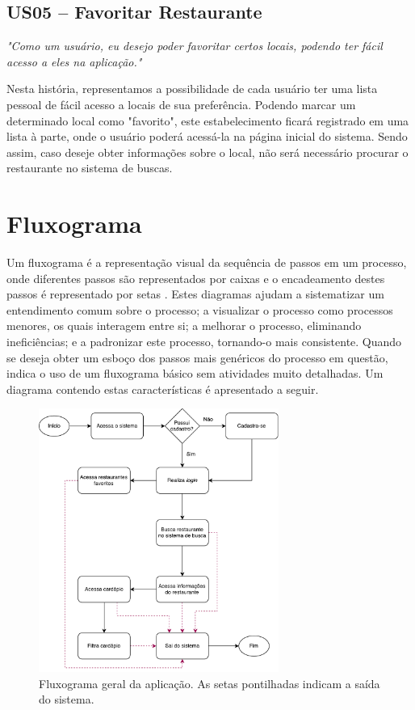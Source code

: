 \subsection{US05 -- Favoritar Restaurante}

\textit{"Como um usuário, eu desejo poder favoritar certos locais, podendo ter fácil acesso a eles na aplicação."}

Nesta história, representamos a possibilidade de cada usuário ter uma lista pessoal de fácil acesso a locais de sua preferência. Podendo marcar um determinado local como "favorito", este estabelecimento ficará registrado em uma lista à parte, onde o usuário poderá acessá-la na página inicial do sistema. Sendo assim, caso deseje obter informações sobre o local, não será necessário procurar o restaurante no sistema de buscas.

\section{Fluxograma}
Um fluxograma é a representação visual da sequência de passos em um processo, onde diferentes passos são representados por caixas e o encadeamento destes passos é representado por setas \cite{REYNARD1995}. Estes diagramas ajudam a sistematizar um entendimento comum sobre o processo; a visualizar o processo como processos menores, os quais interagem entre si; a melhorar o processo, eliminando ineficiências; e a padronizar este processo, tornando-o mais consistente. Quando se deseja obter um esboço dos passos mais genéricos do processo em questão, \cite{REYNARD1995} indica o uso de um fluxograma básico sem atividades muito detalhadas. Um diagrama contendo estas características é apresentado a seguir.

\begin{figure}[H]
    \centering
    \caption[Fluxograma Geral do Sistema]{\label{fig:fluxograma}Fluxograma geral da aplicação. As setas pontilhadas indicam a saída do sistema.}
    \includegraphics[width=0.7\textwidth]{pdf/fluxograma-usuario.pdf}
\end{figure}

